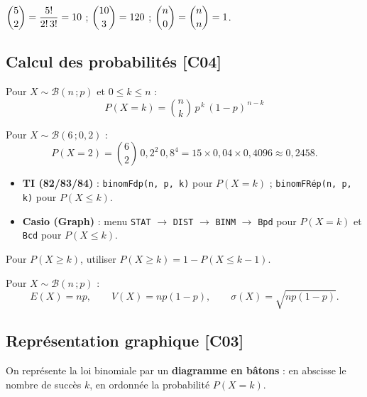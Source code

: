 \documentclass[a4paper,11pt]{article}
\begin{document}
\begin{exemple}
$\dbinom{5}{2} = \dfrac{5!}{2!\,3!} = 10$ ; \quad $\dbinom{10}{3} = 120$ ; \quad $\dbinom{n}{0} = \dbinom{n}{n} = 1$.
\end{exemple}

\subsection{Calcul des probabilités \hfill {\normalsize\color{uimmred}[C04]}}

\begin{theoreme}
Pour $X \sim \mathcal{B}(n\,;p)$ et $0 \leq k \leq n$ :
\[
\boxed{P(X = k) = \binom{n}{k}\,p^{\,k}\,(1 - p)^{\,n-k}}
\]
\end{theoreme}

\begin{exemple}
Pour $X \sim \mathcal{B}(6\,;0{,}2)$ :
\[
P(X = 2) = \binom{6}{2}\,0{,}2^{2}\,0{,}8^{4} = 15 \times 0{,}04 \times 0{,}4096 \approx 0{,}2458.
\]
\end{exemple}

\begin{calculatrice}
\begin{itemize}
  \item \textbf{TI (82/83/84)} : \texttt{binomFdp(n, p, k)} pour $P(X = k)$ ; \; \texttt{binomFRép(n, p, k)} pour $P(X \leq k)$.
  \item \textbf{Casio (Graph)} : menu \texttt{STAT} $\rightarrow$ \texttt{DIST} $\rightarrow$ \texttt{BINM} $\rightarrow$ \texttt{Bpd} pour $P(X = k)$ et \texttt{Bcd} pour $P(X \leq k)$.
\end{itemize}
Pour $P(X \geq k)$, utiliser $P(X \geq k) = 1 - P(X \leq k-1)$.
\end{calculatrice}

\begin{theoreme}
Pour $X \sim \mathcal{B}(n\,;p)$ :
\[
E(X) = np, \qquad V(X) = np(1 - p), \qquad \sigma(X) = \sqrt{np(1 - p)}.
\]
\end{theoreme}

\subsection{Représentation graphique \hfill {\normalsize\color{uimmred}[C03]}}

On représente la loi binomiale par un \textbf{diagramme en bâtons} : en abscisse le nombre de succès $k$, en ordonnée la probabilité $P(X = k)$.
\end{document}
